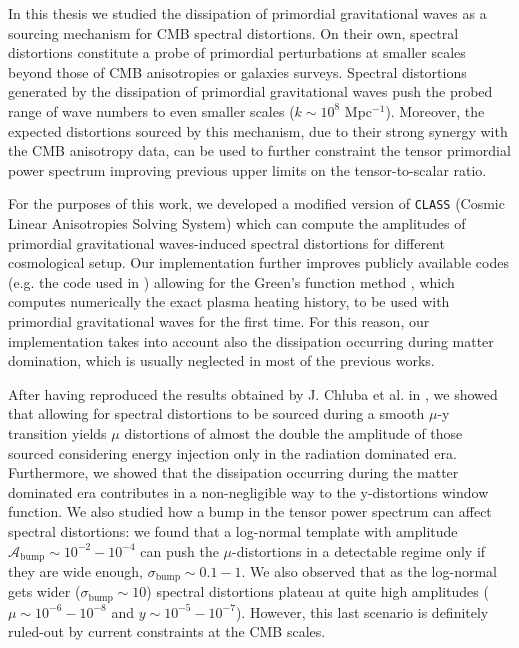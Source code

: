 In this thesis we studied the dissipation of primordial gravitational waves as a sourcing mechanism for CMB spectral distortions. On their own, spectral distortions constitute a probe of primordial perturbations at smaller scales beyond those of CMB anisotropies or galaxies surveys. Spectral distortions generated by the dissipation of primordial gravitational waves push the probed range of wave numbers to even smaller scales ($k\sim10^{8}$ Mpc$^{-1}$). Moreover, the expected distortions sourced by this mechanism, due to their strong synergy with the CMB anisotropy data, can be used to further constraint the tensor primordial power spectrum improving previous upper limits on the tensor-to-scalar ratio.

For the purposes of this work, we developed a modified version of \texttt{CLASS} (Cosmic Linear Anisotropies Solving System) which can compute the amplitudes of primordial gravitational waves-induced spectral distortions for different cosmological setup. Our implementation further improves publicly available codes (e.g. the code used in \cite{Kite_2021}) allowing for the Green's function method \cite{Chluba_Green}, which computes numerically the exact plasma heating history, to be used with primordial gravitational waves for the first time. For this reason, our implementation takes into account also the dissipation occurring during matter domination, which is usually neglected in most of the previous works.

After having reproduced the results obtained by J. Chluba et al. in \cite{Chluba_tens_diss}, we showed that allowing for spectral distortions to be sourced during a smooth $\mu$-y transition yields $\mu$ distortions of almost the double the amplitude of those sourced considering energy injection only in the radiation dominated era. Furthermore, we showed that the dissipation occurring during the matter dominated era contributes in a non-negligible way to the y-distortions window function. We also studied how a bump in the tensor power spectrum can affect spectral distortions: we found that a log-normal template with amplitude $\mathcal A_\text{bump}\sim10^{-2}-10^{-4}$ can push the $\mu$-distortions in a detectable regime only if they are wide enough, $\sigma_\text{bump}\sim 0.1-1$. We also observed that as the log-normal gets wider ($\sigma_\text{bump}\sim10$) spectral distortions plateau at quite high amplitudes ($\mu\sim10^{-6}-10^{-8}$ and $y\sim10^{-5}-10^{-7}$). However, this last scenario is definitely ruled-out by current constraints at the CMB scales.

